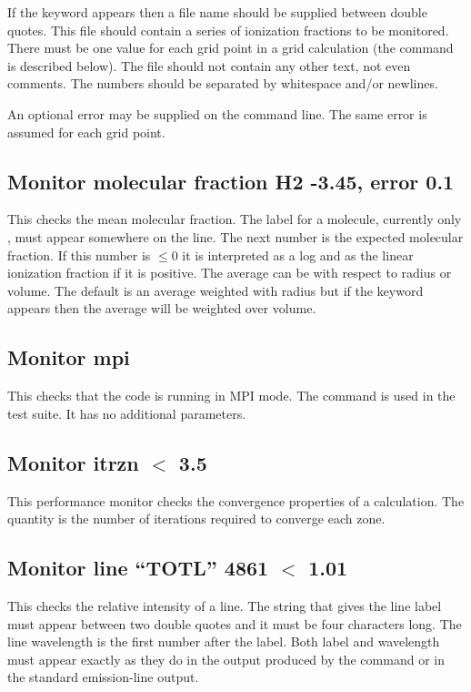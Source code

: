 If the keyword  appears then a file name should be supplied
between double quotes. This file should contain a series of ionization
fractions to be monitored. There must be one value for each grid point in a
grid calculation (the  command is described below). The file
should not contain any other text, not even comments. The numbers should be
separated by whitespace and/or newlines.

An optional error may be supplied on the command line. The same error is
assumed for each grid point.

\subsection{Monitor molecular fraction H2 -3.45, error 0.1}

This checks the mean molecular fraction.
The label for a molecule,
currently only \htwo, must appear somewhere on the line.
The next number is
the expected molecular fraction.
If this number is $\le 0$ it is interpreted
as a log and as the linear ionization fraction if it is positive.
The
average can be with respect to radius or volume.
The default is an average
weighted with radius but if the keyword  appears then the average
will be weighted over volume.

\subsection{Monitor mpi}

This checks that the code is running in MPI mode. The command is used
in the  test suite. It has no additional parameters.

\subsection{Monitor itrzn $<$ 3.5}

This performance monitor checks the convergence properties of a calculation.
The quantity
is the number of iterations required to converge each zone.

\subsection{Monitor line ``TOTL'' 4861 $<$ 1.01}

This checks the relative intensity of a line.
The string that gives
the line label must appear between two double quotes and it must be four
characters long.
The line wavelength is the first number after the label.
Both label and wavelength must appear exactly as they do in the output
produced by the  command or
in the standard emission-line output.

